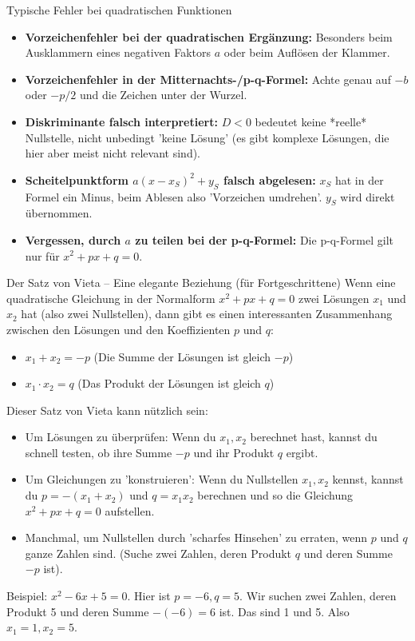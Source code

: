 \begin{fehlerboxumgebung}{Typische Fehler bei quadratischen Funktionen}
\begin{itemize}
    \item \textbf{Vorzeichenfehler bei der quadratischen Ergänzung:} Besonders beim Ausklammern eines negativen Faktors $a$ oder beim Auflösen der Klammer.
    \item \textbf{Vorzeichenfehler in der Mitternachts-/p-q-Formel:} Achte genau auf $-b$ oder $-p/2$ und die Zeichen unter der Wurzel.
    \item \textbf{Diskriminante falsch interpretiert:} $D<0$ bedeutet keine *reelle* Nullstelle, nicht unbedingt 'keine Lösung' (es gibt komplexe Lösungen, die hier aber meist nicht relevant sind).
    \item \textbf{Scheitelpunktform $a(x-x_S)^2+y_S$ falsch abgelesen:} $x_S$ hat in der Formel ein Minus, beim Ablesen also 'Vorzeichen umdrehen'. $y_S$ wird direkt übernommen.
    \item \textbf{Vergessen, durch $a$ zu teilen bei der p-q-Formel:} Die p-q-Formel gilt nur für $x^2+px+q=0$.
\end{itemize}
\end{fehlerboxumgebung}

\begin{infoboxumgebung}{Der Satz von Vieta – Eine elegante Beziehung (für Fortgeschrittene)}
Wenn eine quadratische Gleichung in der Normalform $x^2+px+q=0$ zwei Lösungen $x_1$ und $x_2$ hat (also zwei Nullstellen), dann gibt es einen interessanten Zusammenhang zwischen den Lösungen und den Koeffizienten $p$ und $q$:
\begin{itemize}
    \item $x_1 + x_2 = -p$ (Die Summe der Lösungen ist gleich $-p$)
    \item $x_1 \cdot x_2 = q$ (Das Produkt der Lösungen ist gleich $q$)
\end{itemize}
Dieser Satz von Vieta kann nützlich sein:
\begin{itemize}
    \item Um Lösungen zu überprüfen: Wenn du $x_1, x_2$ berechnet hast, kannst du schnell testen, ob ihre Summe $-p$ und ihr Produkt $q$ ergibt.
    \item Um Gleichungen zu 'konstruieren': Wenn du Nullstellen $x_1, x_2$ kennst, kannst du $p=-(x_1+x_2)$ und $q=x_1x_2$ berechnen und so die Gleichung $x^2+px+q=0$ aufstellen.
    \item Manchmal, um Nullstellen durch 'scharfes Hinsehen' zu erraten, wenn $p$ und $q$ ganze Zahlen sind. (Suche zwei Zahlen, deren Produkt $q$ und deren Summe $-p$ ist).
\end{itemize}
Beispiel: $x^2 - 6x + 5 = 0$. Hier ist $p=-6, q=5$.
Wir suchen zwei Zahlen, deren Produkt 5 und deren Summe $-(-6)=6$ ist. Das sind 1 und 5. Also $x_1=1, x_2=5$.
\end{infoboxumgebung}

